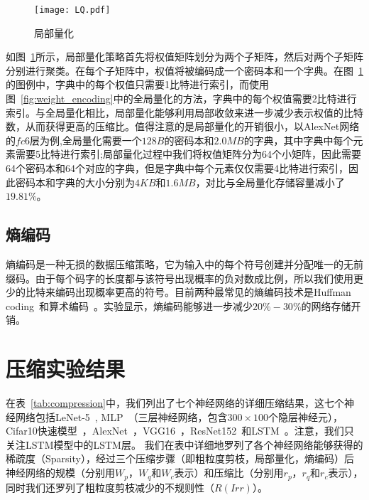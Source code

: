 \begin{figure}[h]
  \centering
  \texttt{[image: LQ.pdf]}
  \caption{局部量化}
  \label{fig:local_quantization}
\end{figure}

如图~\ref{fig:local_quantization}所示，局部量化策略首先将权值矩阵划分为两个子矩阵，然后对两个子矩阵分别进行聚类。在每个子矩阵中，权值将被编码成一个密码本和一个字典。在图~\ref{fig:local_quantization}的图例中，字典中的每个权值只需要1比特进行索引，而使用图~\ref{fig:weight_encoding}中的全局量化的方法，字典中的每个权值需要2比特进行索引。与全局量化相比，局部量化能够利用局部收敛来进一步减少表示权值的比特数，从而获得更高的压缩比。值得注意的是局部量化的开销很小，以AlexNet网络的$fc6$层为例,全局量化需要一个$128B$的密码本和$2.0MB$的字典，其中字典中每个元素需要5比特进行索引;局部量化过程中我们将权值矩阵分为64个小矩阵，因此需要64个密码本和64个对应的字典，但是字典中每个元素仅仅需要4比特进行索引，因此密码本和字典的大小分别为$4KB$和$1.6MB$，对比与全局量化存储容量减小了$19.81\%$。


\subsection{熵编码}
熵编码是一种无损的数据压缩策略，它为输入中的每个符号创建并分配唯一的无前缀码。由于每个码字的长度都与该符号出现概率的负对数成比例，所以我们使用更少的比特来编码出现概率更高的符号。目前两种最常见的熵编码技术是Huffman coding~\cite{huffman1952method}和算术编码~\cite{witten1987arithmetic}。实验显示，熵编码能够进一步减少$20\% - 30\%$的网络存储开销。

\section{压缩实验结果}

在表~\ref{tab:compression}中，我们列出了七个神经网络的详细压缩结果，这七个神经网络包括LeNet-5~\cite{lecun1998gradient}, MLP~\cite{Srivastava2014}（三层神经网络，包含$300\times 100$个隐层神经元），Cifar10快速模型~\cite{krizhevsky2012cuda}，AlexNet~\cite{krizhevsky2012imagenet}，VGG16~\cite{simonyan2014very}，ResNet152~\cite{he2016deep}和LSTM~\cite{sak2014long}。注意，我们只关注LSTM模型中的LSTM层。
我们在表中详细地罗列了各个神经网络能够获得的稀疏度（Sparsity），经过三个压缩步骤（即粗粒度剪枝，局部量化，熵编码）后神经网络的规模（分别用$W_p$，$W_q$和$W_c$表示）和压缩比（分别用$r_p$，$r_q$和$r_c$表示），同时我们还罗列了粗粒度剪枝减少的不规则性（$R(Irr)$）。

